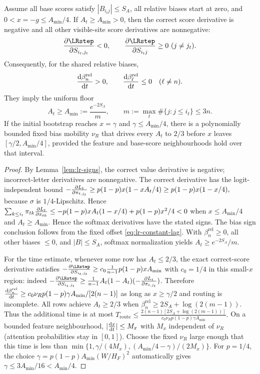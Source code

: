 \begin{lrlemma}
\label{lem:lr-bias-learning}
Assume all base scores satisfy $|B_{i_tj}|\le S_A$,
all relative biases start at zero, and
$0<x=-g\le A_{\min}/4$. If $A_t\ge A_{\min}>0$,
then the correct score derivative is negative and all other visible-site
score derivatives are nonnegative:
\begin{equation}\label{eq:lr-smallscore-sign}
 \pd{\LRstep}{S_{i_t,j_t}}<0,\qquad \pd{\LRstep}{S_{i_tj}}\ge0\ (j\ne j_t).
\end{equation}
Consequently, for the shared relative biases,
\begin{equation}\label{eq:lr-beta-routes}
 \ddt{\beta_n^{\mathrm{rel}}}>0,\qquad
 \ddt{\beta_\ell^{\mathrm{rel}}}\le0\quad(\ell\ne n).
\end{equation}
They imply the uniform floor
\begin{equation}\label{eq:lr-floor}
 A_t\ge A_{\min}:=\frac{e^{-2S_A}}m,
 \qquad m:=\max_t\#\{j:j\le i_t\}\le3n.
\end{equation}
If the initial bootstrap reaches $x=\gamma$ and
$\gamma\le A_{\min}/4$, there is a polynomially bounded fixed bias
mobility $\nu_R$ that drives every $A_t$ to $2/3$ before $x$ leaves
$[\gamma/2,A_{\min}/4]$, provided the feature and base-score
neighbourhoods hold over that interval.
\end{lrlemma}
\begin{proof}
By Lemma~\ref{lem:lr-signs}, the correct value derivative is negative;
incorrect-letter derivatives are nonnegative.  The correct derivative has the logit-independent bound
 $-\pd{L_t}{\pi_{t,j_t}}\ge p(1-p) x(1-xA_t/4)\ge p(1-p) x(1-x/4),$ 
because $\sigma$ is $1/4$-Lipschitz. Hence
 $\sum_{k\le i_t}\pi_{tk}\pd{L_t}{\pi_{tk}}\le-p(1-p) x A_t(1-x/4)+p(1-p) x^2/4<0$ 
when $x\le A_{\min}/4$ and $A_t\ge A_{\min}$.  Hence the softmax derivatives have the stated signs.
The bias sign conclusion follows from the fixed offset
\eqref{eq:lr-constant-lag}.
With $\beta_n^{\mathrm{rel}}\ge0$, all other biases $\le0$,
and $|B|\le S_A$, softmax normalization yields
$A_t\ge e^{-2S_A}/m$.

For the time estimate, whenever some row has $A_t\le2/3$, the exact
correct-score derivative satisfies
$-\pd{\LRstep}{S_{i_t,j_t}}\ge c_0\frac1{n-1}p(1-p) xA_{\min}$
with $c_0=1/4$ in this small-$x$ region: indeed
$-\pd{\LRstep}{S_{i_t,j_t}}\ge\frac1{n-1} A_t(1-A_t)(-\pd{L_t}{\pi_{t,j_t}})$.
Therefore
$\ddt{\beta_n^{\mathrm{rel}}}
\ge c_0\nu_Rp(1-p)\gamma A_{\min}/[2(n-1)]$
as long as $x\ge\gamma/2$ and routing is incomplete.
All rows achieve $A_t\ge2/3$ when
$\beta_n^{\mathrm{rel}}\ge
2S_A+\log(2(m-1))$.
Thus the additional time is at most
 $T_{\mathrm{route}} \le \frac{2(n-1)[2S_A+\log(2(m-1))]} {c_0\nu_Rp(1-p)\gamma A_{\min}}.$ 
On a bounded feature neighbourhood, $|\ddt{x}|\le M_x$ with $M_x$
independent of $\nu_R$ (attention probabilities stay in $[0,1]$).
Choose the fixed $\nu_R$ large enough that this time is less than
$\min\{1,\gamma/(4M_x),(A_{\min}/4-\gamma)/(2M_x)\}$.
For $p=1/4$, the choice $\gamma=p(1-p) A_{\min}(W/H_F)^2$
automatically gives $\gamma\le3A_{\min}/16<A_{\min}/4$.
\end{proof}


